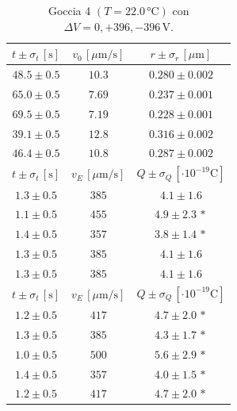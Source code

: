 \documentclass[]{article}
\begin{document}
    \begin{table}[H]
        \centering
        \begin{tabular}{||c|c|c||}
            \hline
            $t \pm \sigma_t \, \left[\text{s}\right]$ & $v_0 \, \left[\mu\text{m/s}\right]$ & $r \pm \sigma_r \, \left[\mu\text{m}\right]$ \\\hline
            \hline
            $48.5 \pm 0.5$ & $10.3$ & $0.280 \pm 0.002$ \\\hline
            $65.0 \pm 0.5$ & $7.69$ & $0.237 \pm 0.001$ \\\hline
            $69.5 \pm 0.5$ & $7.19$ & $0.228 \pm 0.001$ \\\hline
            $39.1 \pm 0.5$ & $12.8$ & $0.316 \pm 0.002$ \\\hline
            $46.4 \pm 0.5$ & $10.8$ & $0.287 \pm 0.002$ \\\hline
            \hline
            $t \pm \sigma_t \, \left[\text{s}\right]$ & $v_E \, \left[\mu\text{m/s}\right]$ & $Q \pm \sigma_Q \, \left[\cdot 10^{-19} \text{C}\right]$ \\\hline
            \hline
            $1.3 \pm 0.5$ & $385$ & $4.1 \pm 1.6$ \\\hline
            $1.1 \pm 0.5$ & $455$ & $4.9 \pm 2.3\,\ast$ \\\hline
            $1.4 \pm 0.5$ & $357$ & $3.8 \pm 1.4\,\ast$ \\\hline
            $1.3 \pm 0.5$ & $385$ & $4.1 \pm 1.6$ \\\hline
            $1.3 \pm 0.5$ & $385$ & $4.1 \pm 1.6$ \\\hline
            \hline
            $t \pm \sigma_t \, \left[\text{s}\right]$ & $v_E \, \left[\mu\text{m/s}\right]$ & $Q \pm \sigma_Q \, \left[\cdot 10^{-19} \text{C}\right]$ \\\hline
            \hline
            $1.2 \pm 0.5$ & $417$ & $4.7 \pm 2.0\,\ast$ \\\hline
            $1.3 \pm 0.5$ & $385$ & $4.3 \pm 1.7\,\ast$ \\\hline
            $1.0 \pm 0.5$ & $500$ & $5.6 \pm 2.9\,\ast$ \\\hline
            $1.4 \pm 0.5$ & $357$ & $4.0 \pm 1.5\,\ast$ \\\hline
            $1.2 \pm 0.5$ & $417$ & $4.7 \pm 2.0\,\ast$ \\\hline
        \end{tabular}
        \caption{Goccia 4 $\left(T = 22.0\, \text{°C}\right)$ con $\Delta V = 0,+396,-396 \,\text{V}$.}
        \label{goccia-4}
    \end{table}
\end{document}

